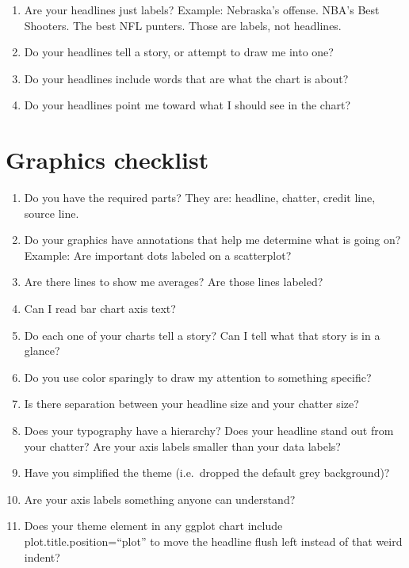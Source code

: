 \documentclass[
  letterpaper,
  DIV=11,
  numbers=noendperiod]{scrreprt}
\providecommand{\tightlist}{%
  \setlength{\itemsep}{0pt}\setlength{\parskip}{0pt}}\usepackage{longtable,booktabs,array}
\begin{document}
\begin{enumerate}
\def\labelenumi{\arabic{enumi}.}
\tightlist
\item
  Are your headlines just labels? Example: Nebraska's offense. NBA's
  Best Shooters. The best NFL punters. Those are labels, not headlines.
\item
  Do your headlines tell a story, or attempt to draw me into one?
\item
  Do your headlines include words that are what the chart is about?
\item
  Do your headlines point me toward what I should see in the chart?
\end{enumerate}

\hypertarget{graphics-checklist}{%
\section{Graphics checklist}\label{graphics-checklist}}

\begin{enumerate}
\def\labelenumi{\arabic{enumi}.}
\tightlist
\item
  Do you have the required parts? They are: headline, chatter, credit
  line, source line.
\item
  Do your graphics have annotations that help me determine what is going
  on? Example: Are important dots labeled on a scatterplot?
\item
  Are there lines to show me averages? Are those lines labeled?
\item
  Can I read bar chart axis text?
\item
  Do each one of your charts tell a story? Can I tell what that story is
  in a glance?
\item
  Do you use color sparingly to draw my attention to something specific?
\item
  Is there separation between your headline size and your chatter size?
\item
  Does your typography have a hierarchy? Does your headline stand out
  from your chatter? Are your axis labels smaller than your data labels?
\item
  Have you simplified the theme (i.e.~dropped the default grey
  background)?
\item
  Are your axis labels something anyone can understand?
\item
  Does your theme element in any ggplot chart include
  plot.title.position=``plot'' to move the headline flush left instead
  of that weird indent?
\end{enumerate}
\end{document}
